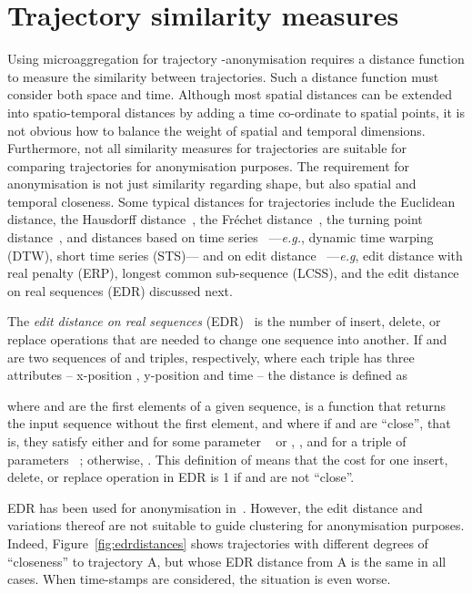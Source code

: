 \section{Trajectory similarity measures}
\label{sec:relworkdistances}

Using microaggregation
for trajectory -anonymisation requires a distance function to measure
the similarity between trajectories.
Such a distance function must consider both space and time.
Although most spatial distances
can be extended into spatio-temporal distances by adding
a time co-ordinate to spatial points,
it is not obvious how to
balance the weight of spatial and temporal
dimensions.
Furthermore, not all similarity measures for trajectories are
suitable for comparing trajectories for anonymisation purposes.
The requirement for anonymisation is not just similarity regarding shape, but
also spatial and temporal closeness. Some typical distances for
trajectories
include the Euclidean distance, the Hausdorff distance~\cite{shonkwiler91},
the Fr\'echet distance~\cite{alt95}, the turning point distance~\cite{arkin91},
and distances based on time series~\cite{liao05}
---{\em e.g.}, dynamic time warping (DTW), short
time series (STS)--- and on edit distance~\cite{chen05}
---{\em e.g}, edit distance
with real penalty (ERP), longest common sub-sequence (LCSS), and the edit
distance on real sequences (EDR) discussed next.

The \emph{edit distance on real sequences} (EDR)~\cite{chen05}
is the number of insert, delete, or replace operations
that are needed to change one sequence into another.
If  and  are two sequences
of  and  triples, respectively, where each triple  has three
attributes -- x-position , y-position  and time
 --
the distance  is defined as

 where  and  are the first elements of a given sequence,
 is a function that returns the input sequence without the
first element, and where  if  and  are ``close'',
that is, they satisfy either
 and  for some
parameter ~\cite{chen05} or  ,
, and  for a triple of
parameters ~\cite{abul10}; otherwise, . This
definition of  means that the cost for one insert, delete, or replace
operation in EDR is 1 if  and  are not ``close''.

EDR has been used for anonymisation in~\cite{abul10}. However, the
edit distance and variations thereof
are not suitable to guide clustering
for anonymisation purposes. Indeed,
Figure~\ref{fig:edrdistances} shows trajectories with
different degrees of ``closeness'' to trajectory A,
but whose EDR distance from A is the same in all cases.
When time-stamps are considered, the situation is even worse.

